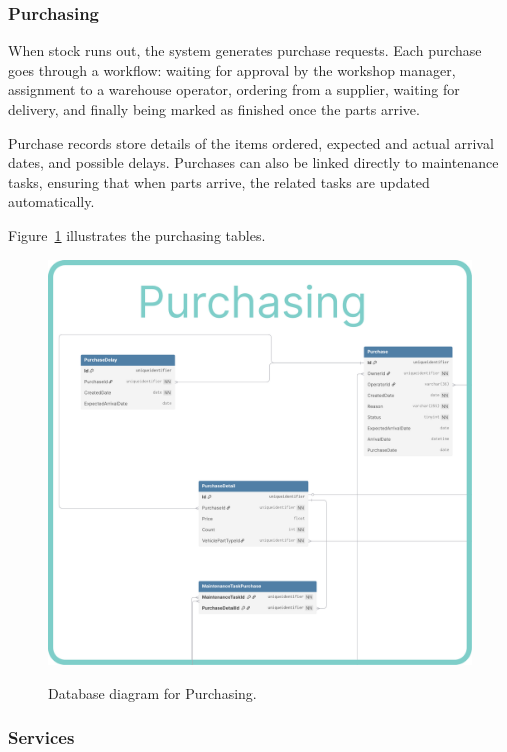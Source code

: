 \subsubsection{Purchasing} 


When stock runs out, the system generates purchase requests. Each purchase goes through a workflow: waiting for approval by the workshop manager, assignment to a warehouse operator, ordering from a supplier, waiting for delivery, and finally being marked as finished once the parts arrive.

Purchase records store details of the items ordered, expected and actual arrival dates, and possible delays. Purchases can also be linked directly to maintenance tasks, ensuring that when parts arrive, the related tasks are updated automatically.

Figure~\ref{fig:dbPurchasing} illustrates the purchasing tables.

\begin{figure}[h]
  \caption{Database diagram for Purchasing.}
  \centering
  \includegraphics[width=\textwidth]{figs/dbDiagrams/Purchasing}
  \label{fig:dbPurchasing}
\end{figure}


\subsubsection{Services} 

